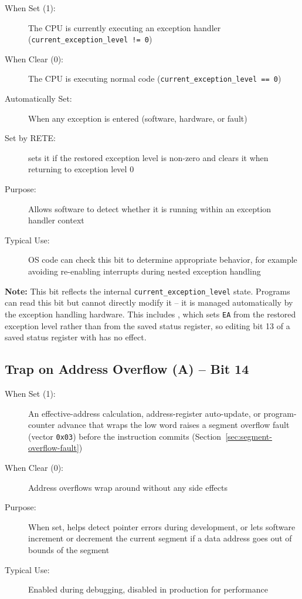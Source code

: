 \begin{description}
	\item[When Set (1):] The CPU is currently executing an exception handler (\texttt{current\_exception\_level != 0})
	\item[When Clear (0):] The CPU is executing normal code (\texttt{current\_exception\_level == 0})
	\item[Automatically Set:] When any exception is entered (software, hardware, or fault)
	\item[Set by RETE:]  sets it if the restored exception level is non-zero and clears it when returning to
	      exception level 0
	\item[Purpose:] Allows software to detect whether it is running within an exception handler context
	\item[Typical Use:] OS code can check this bit to determine appropriate behavior, for example avoiding re-enabling interrupts
	      during nested exception handling
\end{description}

\textbf{Note:} This bit reflects the internal \texttt{current\_exception\_level} state. Programs can read this bit but
cannot directly modify it -- it is managed automatically by the exception handling hardware. This includes
, which sets \texttt{EA} from the restored exception level rather than from the saved status register, so
editing bit 13 of a saved status register with  has no effect.

\subsection{Trap on Address Overflow (A) -- Bit 14}

\begin{description}
	\item[When Set (1):] An effective-address calculation, address-register auto-update, or program-counter advance that wraps
	      the low word raises a segment overflow fault (vector \texttt{0x03}) before the instruction commits
	      (Section~\ref{sec:segment-overflow-fault})
	\item[When Clear (0):] Address overflows wrap around without any side effects
	\item[Purpose:] When set, helps detect pointer errors during development, or lets software increment or decrement the current
	      segment if a data address goes out of bounds of the segment
	\item[Typical Use:] Enabled during debugging, disabled in production for performance
\end{description}

